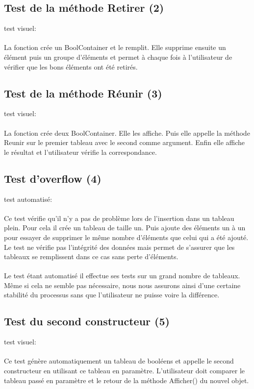\documentclass[a4paper, 12pts]{article}
\begin{document}
\subsection{Test de la méthode Retirer (2)}
test visuel:
\paragraph{}
La fonction crée un BoolContainer et le remplit. Elle supprime ensuite un élément puis un groupe d’éléments et permet à chaque fois à l’utilisateur de vérifier que les bons éléments ont été retirés.

\subsection{Test de la méthode Réunir (3)}
test visuel:
\paragraph{}
La fonction crée deux BoolContainer. Elle les affiche. Puis elle appelle la méthode Reunir sur le premier tableau avec le second comme argument. Enfin elle affiche le résultat et l’utilisateur vérifie la correspondance.

\subsection{Test d'overflow (4)}
test automatisé:
\paragraph{}
Ce test vérifie qu'il n'y a pas de problème lors de l'insertion dans un tableau plein. Pour cela il crée un tableau de taille un. Puis ajoute des éléments un à un pour essayer de supprimer le même nombre d’éléments que celui qui a été ajouté. Le test ne vérifie pas l’intégrité des données mais permet de s'assurer que les tableaux se remplissent dans ce cas sans perte d'éléments.
\paragraph{}
Le test étant automatisé il effectue ses tests sur un grand nombre de tableaux. Même si cela ne semble pas nécessaire, nous nous assurons ainsi d'une certaine stabilité du processus sans que l'utilisateur ne puisse voire la différence.

\subsection{Test du second constructeur (5)}
test visuel:
\paragraph{}
Ce test génère automatiquement un tableau de booléens et appelle le second constructeur en utilisant ce tableau en paramètre. L'utilisateur doit comparer le tableau passé en paramètre et le retour de la méthode Afficher() du nouvel objet.
\end{document}
